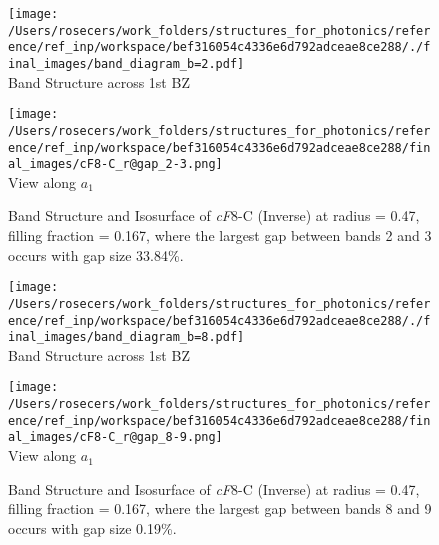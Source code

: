 \begin{figure}[H]
\begin{minipage}{0.5\textwidth}\centering
\texttt{[image: /Users/rosecers/work\_folders/structures\_for\_photonics/reference/ref\_inp/workspace/bef316054c4336e6d792adceae8ce288/./final\_images/band\_diagram\_b=2.pdf]}
\\Band Structure across 1st BZ
\end{minipage}\hfill
\begin{minipage}{0.48\textwidth}\centering
\texttt{[image: /Users/rosecers/work\_folders/structures\_for\_photonics/reference/ref\_inp/workspace/bef316054c4336e6d792adceae8ce288/final\_images/cF8-C\_r@gap\_2-3.png]}
\\View along $a_1$ 
\end{minipage}\hfill\caption{Band Structure and Isosurface of \textit{cF}8-C (Inverse) at radius = 0.47, filling fraction = 0.167, where the largest gap between bands 2 and 3 occurs with gap size 33.84\%.}

\end{figure}
\vspace{-0.25in}


\begin{figure}[H]
\begin{minipage}{0.5\textwidth}\centering
\texttt{[image: /Users/rosecers/work\_folders/structures\_for\_photonics/reference/ref\_inp/workspace/bef316054c4336e6d792adceae8ce288/./final\_images/band\_diagram\_b=8.pdf]}
\\Band Structure across 1st BZ
\end{minipage}\hfill
\begin{minipage}{0.48\textwidth}\centering
\texttt{[image: /Users/rosecers/work\_folders/structures\_for\_photonics/reference/ref\_inp/workspace/bef316054c4336e6d792adceae8ce288/final\_images/cF8-C\_r@gap\_8-9.png]}
\\View along $a_1$ 
\end{minipage}\hfill\caption{Band Structure and Isosurface of \textit{cF}8-C (Inverse) at radius = 0.47, filling fraction = 0.167, where the largest gap between bands 8 and 9 occurs with gap size 0.19\%.}

\end{figure}
\vspace{-0.25in}

